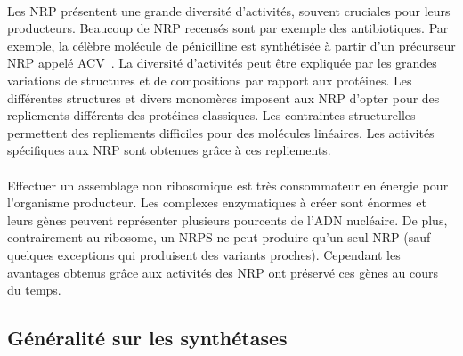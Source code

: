 \documentclass[12pt,french,twoside]{report}
\begin{document}
\paragraph{}Les NRP présentent une grande diversité d'activités, souvent cruciales pour leurs producteurs.
Beaucoup de NRP recensés sont par exemple des antibiotiques.
Par exemple, la célèbre molécule de pénicilline est synthétisée à partir d'un précurseur NRP appelé ACV~\cite{queener_molecular_1990}.
La diversité d'activités peut être expliquée par les grandes variations de structures et de compositions par rapport aux protéines.
Les différentes structures et divers monomères imposent aux NRP d'opter pour des repliements différents des protéines classiques.
Les contraintes structurelles permettent des repliements difficiles pour des molécules linéaires.
Les activités spécifiques aux NRP sont obtenues grâce à ces repliements.

\paragraph{}Effectuer un assemblage non ribosomique est très consommateur en énergie pour l'organisme producteur.
Les complexes enzymatiques à créer sont énormes et leurs gènes peuvent représenter plusieurs pourcents de l'ADN nucléaire.
De plus, contrairement au ribosome, un NRPS ne peut produire qu'un seul NRP (sauf quelques exceptions qui produisent des variants proches).
Cependant les avantages obtenus grâce aux activités des NRP ont préservé ces gènes au cours du temps.


\subsection{Généralité sur les synthétases}
\end{document}
